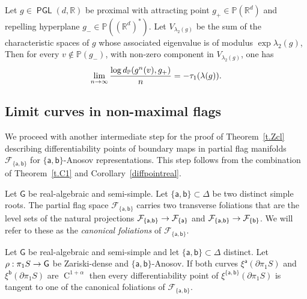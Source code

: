 \documentclass[AHL,Unicode,longabstracts,MathTools]{cedram}
\DeclareMathOperator{\class}{C}
\DeclareMathOperator{\PGL}{{\mathsf{PGL}}}
\renewcommand{\sf}[1]{{\mathsf{#1}}}
\newcommand{\sroot}{{\sf{a}}}
\newcommand{\bb}{{\sf{b}}}
\newcommand{\sfG}{\sf{G}}
\newcommand{\calF}{\mathcal{F}}
\newcommand{\R}{\mathbb{R}}
\renewcommand{\P}{\mathbb{P}}
\newcommand{\bord}{\partial}
\newcommand{\piS}{\pi_1S}
\newcommand{\simple}{{\sf \Delta}}
\newcommand{\slroot}{{\tau}}
\renewcommand{\/}{\backslash}
\newcommand{\<}{\langle}
\renewcommand{\>}{\rangle}
\renewcommand*{\to}{\mathchoice{\longrightarrow}{\rightarrow}{\rightarrow}{\rightarrow}}
\begin{document}
\begin{lemm}\label{lambda2}
Let $g\in\PGL(d,\R)$ be proximal with attracting point $g_+\in\P(\R^d)$ and repelling hyperplane $g_-\in\P((\R^d)^*)$. Let $V_{\lambda_2(g)}$ be the sum of the characteristic spaces of $g$ whose associated eigenvalue is of modulus $\exp\lambda_2(g)$, Then for every $v\notin\P(g_-)$, with non-zero component in $V_{\lambda_2(g)}$, one has
\[
\lim_{n\to\infty}\frac{\log d_\P(g^n(v),g_+)}n= -\slroot_1(\lambda(g)).
\]
\end{lemm}



\subsection{Limit curves in non-maximal flags}

We proceed with another intermediate step for the proof of Theorem~\ref{t.Zcl} describing differentiability points of boundary maps in partial flag manifolds $\calF_{\{\sroot,\bb\}}$ for $\{\sroot,\bb\}$-Anosov representations. This step follows from the combination of Theorem~\ref{t.C1} and Corollary~\ref{diffpointreal}.



Let $\sfG$ be real-algebraic and semi-simple. Let $\{\sroot,\bb\}\subset\simple$ be two distinct simple roots. The partial flag space $\calF_{\{\sroot,\bb\}}$ carries two transverse foliations that are the level sets of the natural projections $\calF_{\{\sroot,\bb\}}\to\calF_{\{\sroot\}}$ and $\calF_{\{\sroot,\bb\}}\to\calF_{\{\bb\}}$. We will refer to these as the \emph{canonical foliations} of $\calF_{\{\sroot,\bb\}}$.


\begin{coro}\label{nonC1}
Let $\sfG$ be real-algebraic and semi-simple and let $\{\sroot,\bb\}\subset\simple$ distinct. Let $\rho:\piS\to\sfG$ be Zariski-dense and $\{\sroot,\bb\}$-Anosov. If both curves $\xi^\sroot(\bord\piS)$ and $\xi^{\bb}(\bord\piS)$ are $\class^{1+\alpha}$ then every differentiability point of $\xi^{\{\sroot,\bb\}}(\bord\piS)$ is tangent to one of the canonical foliations of $\calF_{\{\sroot,\bb\}}$.
\end{coro}
\end{document}
